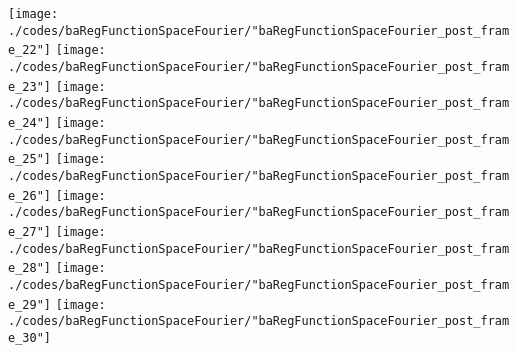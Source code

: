 \begin{frame}{\insertsection}
\begin{center}
{\begin{animateinline}{20}
				 \texttt{[image: ./codes/baRegFunctionSpaceFourier/"baRegFunctionSpaceFourier\_post\_frame\_22"]}\newframe
				 \texttt{[image: ./codes/baRegFunctionSpaceFourier/"baRegFunctionSpaceFourier\_post\_frame\_23"]}\newframe
				 \texttt{[image: ./codes/baRegFunctionSpaceFourier/"baRegFunctionSpaceFourier\_post\_frame\_24"]}\newframe
				 \texttt{[image: ./codes/baRegFunctionSpaceFourier/"baRegFunctionSpaceFourier\_post\_frame\_25"]}\newframe
				 \texttt{[image: ./codes/baRegFunctionSpaceFourier/"baRegFunctionSpaceFourier\_post\_frame\_26"]}\newframe
				 \texttt{[image: ./codes/baRegFunctionSpaceFourier/"baRegFunctionSpaceFourier\_post\_frame\_27"]}\newframe
				 \texttt{[image: ./codes/baRegFunctionSpaceFourier/"baRegFunctionSpaceFourier\_post\_frame\_28"]}\newframe
				 \texttt{[image: ./codes/baRegFunctionSpaceFourier/"baRegFunctionSpaceFourier\_post\_frame\_29"]}\newframe
				 \texttt{[image: ./codes/baRegFunctionSpaceFourier/"baRegFunctionSpaceFourier\_post\_frame\_30"]}
			 \end{animateinline}
			}
	\end{center}
    
\end{frame}


